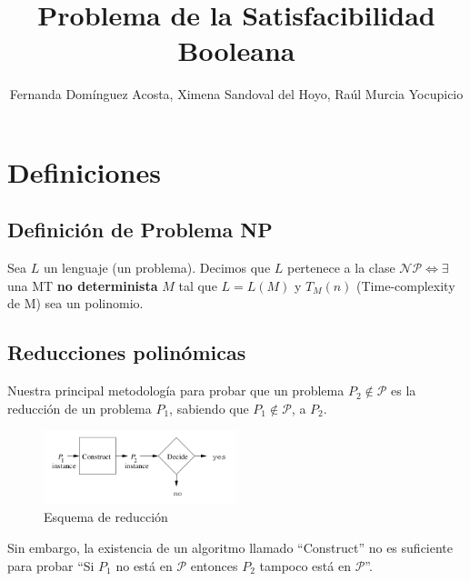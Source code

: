 \documentclass[a4paper]{article}
\title{Problema de la Satisfacibilidad Booleana}
\author{Fernanda Domínguez Acosta, Ximena Sandoval del Hoyo, Raúl Murcia Yocupicio}
\begin{document}
\maketitle


\section{Definiciones}

\subsection{Definición de Problema NP}

Sea $L$ un lenguaje (un problema). Decimos que $L$ pertenece a la clase
$\mathcal{NP} \Leftrightarrow \exists$ una MT \textbf{no determinista} $M$
tal que $L = L(M)$ y $T_M(n)$ (Time-complexity de M) sea un polinomio.



\subsection{Reducciones polinómicas}
Nuestra principal metodología para probar que un problema $P_2 \notin \mathcal{P}$
es la reducción de un problema $P_1$, sabiendo que $P_1 \notin \mathcal{P}$, a $P_2$.

\begin{figure}[h]
\centering
\graphicspath{ {./Images/} }
\includegraphics[width=0.5\textwidth]{reduccion.png}
\caption{\label{fig:Reduccion}Esquema de reducción\cite{hopcroft2001introduction}}
\end{figure}
Sin embargo, la existencia de un algoritmo llamado ``Construct'' no es suficiente
para probar ``Si $P_1$ no está en $\mathcal{P}$ entonces $P_2$ tampoco está en $\mathcal{P}$''.
\end{document}
